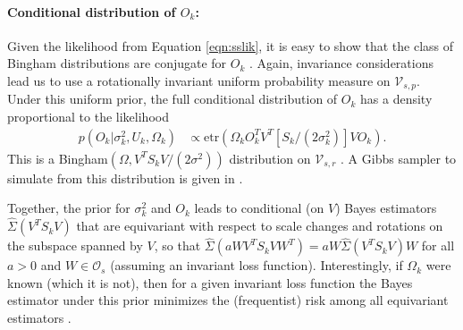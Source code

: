 \documentclass[12pt]{article}
\newcommand{\etr}{\text{etr}}
\begin{document}
\paragraph{Conditional distribution of $O_k$:} Given the likelihood
from Equation \ref{eqn:sslik}, it is easy to show that the class of
Bingham distributions are conjugate for $O_k$ \citep{Hoff2009,
  Hoff2012}.  Again, invariance considerations lead us to use a
rotationally invariant uniform probability measure on
$\mathcal V_{s,p}$.  Under this uniform prior, the full conditional
distribution of $O_k$ has a density proportional to the
likelihood
\begin{align}
\label{lik_vo}
 p(O_k | \sigma^2_k, U_k, \Omega_k) & \propto \etr(\Omega_kO^T_kV^T[S_k/(2\sigma^2_k)]VO_k).
\end{align}
%
\noindent This is a Bingham$(\Omega, V^T S_k V/(2\sigma^2))$
distribution on $\mathcal V_{s, r}$ \citep{Khatri1977}. A
Gibbs sampler to simulate from this distribution is given in
\citet{Hoff2012}.  

Together, the prior for $\sigma_k^2$ and $O_k$ leads to conditional
(on $V$) Bayes estimators $\hat \Sigma(V^T S_k V)$ that are
equivariant with respect to scale changes and rotations on the
subspace spanned by $V$, so
that $\hat \Sigma(a W V^T S_k V W^T) = a W \hat\Sigma(V^T
S_k V)  W$
for all $a>0$ and $ W\in \mathcal O_{s}$ (assuming an invariant
loss function). Interestingly, if $\Omega_k$ were known (which it is
not), then for a given invariant loss function the Bayes estimator
under this prior minimizes the (frequentist) risk among all
equivariant estimators \citep{Eaton1989}.
\end{document}
